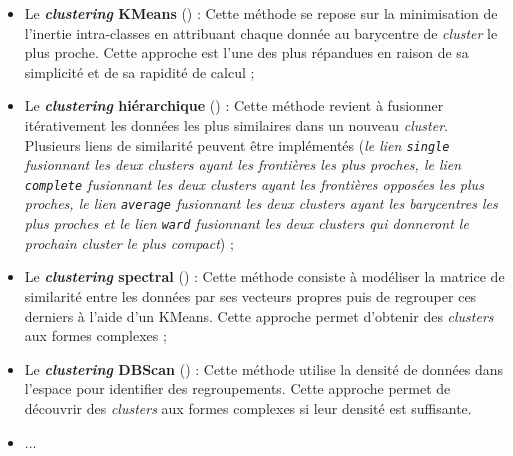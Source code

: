 		\begin{itemize}
			\item Le \textbf{\textit{clustering} KMeans} (\cite{macqueen:1967:methods-classification-analysis}) :
			Cette méthode se repose sur la minimisation de l'inertie intra-classes en attribuant chaque donnée au barycentre de \textit{cluster} le plus proche.
			Cette approche est l'une des plus répandues en raison de sa simplicité et de sa rapidité de calcul ;
			\item Le \textbf{\textit{clustering} hiérarchique} (\cite{murtagh-contreras:2012:algorithms-hierarchical-clustering}) :
			Cette méthode revient à fusionner itérativement les données les plus similaires dans un nouveau \textit{cluster}.
			Plusieurs liens de similarité peuvent être implémentés (\textit{le lien \texttt{single} fusionnant les deux \textit{clusters} ayant les frontières les plus proches, le lien \texttt{complete} fusionnant les deux \textit{clusters} ayant les frontières opposées les plus proches, le lien \texttt{average} fusionnant les deux \textit{clusters} ayant les barycentres les plus proches et le lien \texttt{ward} fusionnant les deux \textit{clusters} qui donneront le prochain \textit{cluster} le plus compact}) ;
			\item Le \textbf{\textit{clustering} spectral} (\cite{ng-etal:2002:spectral-clustering-analysis}) :
			Cette méthode consiste à modéliser la matrice de similarité entre les données par ses vecteurs propres puis de regrouper ces derniers à l'aide d'un KMeans.
			Cette approche permet d'obtenir des \textit{clusters} aux formes complexes ;
			\item Le \textbf{\textit{clustering} DBScan} (\cite{ester-etal:1996:densitybased-algorithm-discovering}) :
			Cette méthode utilise la densité de données dans l'espace pour identifier des regroupements.
			Cette approche permet de découvrir des \textit{clusters} aux formes complexes si leur densité est suffisante.
			\item ...
		\end{itemize}
		
